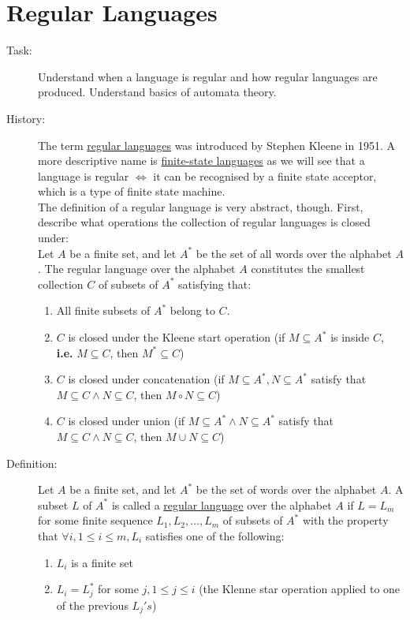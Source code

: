 \documentclass[10pt]{article}
\begin{document}
	\section{Regular Languages}
	\begin{description}
		\item[Task:] Understand when a language is regular and how regular languages are produced. Understand basics of automata theory.
		\item[History:] The term \underline{regular languages} was introduced by Stephen Kleene in 1951. A more descriptive name is \underline{finite-state languages} as we will see that a language is regular $\Leftrightarrow$ it can be recognised by a finite state acceptor, which is a type of finite state machine. \\
		The definition of a regular language is very abstract, though. First, describe what operations the collection of regular languages is closed under: \\
		Let $A$ be a finite set, and let $A^*$ be the set of all words over the alphabet $A$. The regular language over the alphabet $A$ constitutes the smallest collection $C$ of subsets of $A^*$ satisfying that:
		\begin{enumerate}
			\item All finite subsets of $A^*$ belong to $C$.
			\item $C$ is closed under the Kleene start operation (if $M \subseteq A^*$ is inside $C$, \textbf{i.e.} $M \subseteq C$, then $M^* \subseteq C$)
			\item $C$ is closed under concatenation (if $M \subseteq A^*, N \subseteq A^*$ satisfy that $M \subseteq C \land N \subseteq C$, then $M \circ N \subseteq C$)
			\item $C$ is closed under union (if $M \subseteq A^* \land N \subseteq A^*$ satisfy that $M \subseteq C \land N \subseteq C$, then $M \cup N \subseteq C$)
		\end{enumerate}
		\item[Definition:] Let $A$ be a finite set, and let $A^*$ be the set of words over the alphabet $A$. A subset $L$ of $A^*$ is called a \underline{regular language} over the alphabet $A$ if $L = L_m$ for some finite sequence $L_1, L_2,\dots, L_m$ of subsets of $A^*$ with the property that $\forall i, 1 \leq i \leq m, L_i$ satisfies one of the following:
		\begin{enumerate}
			\item $L_i$ is a finite set
			\item $L_i = L_j^*$ for some $j, 1 \leq j \leq i$ (the Klenne star operation applied to one of the previous $L_j's$)

\end{enumerate}
\end{description}
\end{document}
